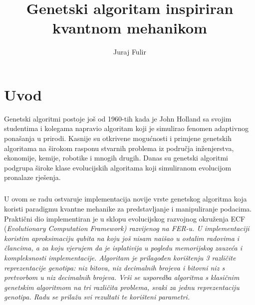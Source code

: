 \documentclass[times, utf8, zavrsni, numeric]{fer}
\begin{document}
\title{Genetski algoritam inspiriran kvantnom mehanikom}
\author{Juraj Fulir}

\maketitle

\izvornik


\tableofcontents

\chapter{Uvod}
Genetski algoritmi postoje još od 1960-tih kada je John Holland sa svojim studentima i kolegama napravio algoritam koji je simulirao fenomen adaptivnog ponašanja u prirodi. Kasnije su otkrivene mogućnosti i primjene genetskih algoritama na širokom rasponu stvarnih problema iz područja inženjerstva, ekonomije, kemije, robotike i mnogih drugih. Danas su genetski algoritmi podgrupa široke klase evolucijskih algoritama koji simuliranom evolucijom pronalaze rješenja. \citep{c_history}

\paragraph{}
U ovom se radu ostvaruje implementacija novije vrste genetskog algoritma koja koristi paradigmu kvantne mehanike za predstavljanje i manipuliranje podacima. Praktični dio implementiran je u sklopu evolucijskog razvojnog okruženja ECF (\it Evolutionary Computation Framework\rm) razvijenog na FER-u. U implementaciji koristim aproksimaciju qubita na koju još nisam naišao u ostalim radovima i člancima, a za koju vjerujem da je isplativija u pogledu memorijskog zauzeća i kompleksnosti implementacije. Algoritam je prilagođen korištenju 3 različite reprezentacije genotipa: niz bitova, niz decimalnih brojeva i bitovni niz s pretvorbom u niz decimalnih brojeva. Vrši se usporedba algoritma s klasičnim genetskim algoritmom na tri različita problema, svaki za jednu reprezentaciju genotipa. Radu se prilažu svi rezultati te korišteni parametri. 
\end{document}
